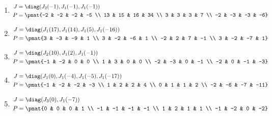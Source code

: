 \begin{enumerate}
\item

\begin{align*}
J &= \diag(J_{2}(-1), J_{1}(-1), J_{1}(-1))\\
P &= \pmat{-2 & -2 & -2 & -5 \\ 13 & 15 & 16 & 34 \\ 3 & 3 & 3 & 7 \\ -2 & -3 & -3 & -6}
\end{align*}

\item

\begin{align*}
J &= \diag(J_{1}(17), J_{1}(14), J_{1}(5), J_{1}(-16))\\
P &= \pmat{3 & -3 & -9 & 1 \\ 3 & -2 & -6 & 1 \\ -2 & 2 & 7 & -1 \\ 3 & -2 & -7 & 1}
\end{align*}

\item

\begin{align*}
J &= \diag(J_{2}(10), J_{1}(2), J_{1}(-1))\\
P &= \pmat{-1 & -2 & 0 & 0 \\ 1 & 3 & 0 & 0 \\ -2 & -3 & 0 & -1 \\ -2 & 0 & -1 & -3}
\end{align*}

\item

\begin{align*}
J &= \diag(J_{1}(0), J_{1}(-4), J_{1}(-5), J_{1}(-17))\\
P &= \pmat{-1 & -2 & -2 & -3 \\ 1 & 2 & 2 & 4 \\ 0 & 1 & 1 & 2 \\ -2 & -6 & -7 & -11}
\end{align*}

\item

\begin{align*}
J &= \diag(J_{3}(0), J_{1}(-7))\\
P &= \pmat{0 & 0 & 0 & 1 \\ -1 & -1 & -1 & -1 \\ 1 & 2 & 1 & 1 \\ -1 & -2 & 0 & -2}
\end{align*}


\end{enumerate}
